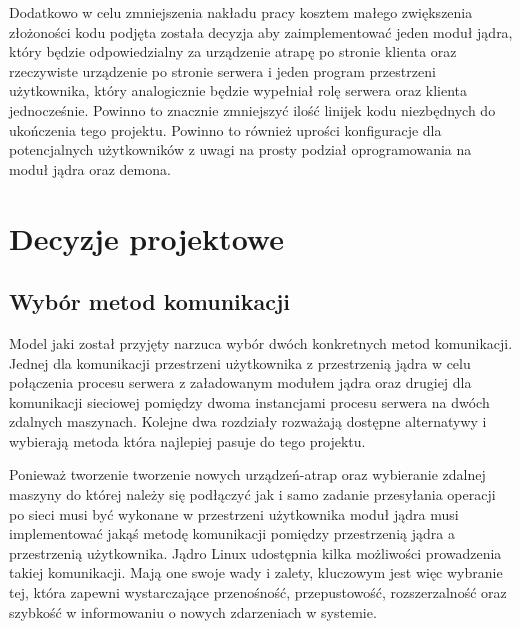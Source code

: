 Dodatkowo w celu zmniejszenia nakładu pracy kosztem małego zwiększenia
złożoności kodu podjęta została decyzja aby zaimplementować jeden moduł
jądra, który będzie odpowiedzialny za urządzenie atrapę po stronie
klienta oraz rzeczywiste urządzenie po stronie serwera i jeden program
przestrzeni użytkownika, który analogicznie będzie wypełniał rolę
serwera oraz klienta jednocześnie. Powinno to znacznie zmniejszyć ilość
linijek kodu niezbędnych do ukończenia tego projektu. Powinno to również
uprości konfiguracje dla potencjalnych użytkowników z uwagi na prosty
podział oprogramowania na moduł jądra oraz demona.

\section{Decyzje projektowe}

\subsection{Wybór metod komunikacji}

Model jaki został przyjęty narzuca wybór dwóch konkretnych metod
komunikacji. Jednej dla komunikacji przestrzeni użytkownika z
przestrzenią jądra w celu połączenia procesu serwera z załadowanym
modułem jądra oraz drugiej dla komunikacji sieciowej pomiędzy dwoma
instancjami procesu serwera na dwóch zdalnych maszynach. Kolejne dwa
rozdziały rozważają dostępne alternatywy i wybierają metoda która
najlepiej pasuje do tego projektu.


Ponieważ tworzenie tworzenie nowych urządzeń-atrap oraz wybieranie
zdalnej maszyny do której należy się podłączyć jak i samo zadanie
przesyłania operacji po sieci musi być wykonane w przestrzeni
użytkownika moduł jądra musi implementować jakąś metodę komunikacji
pomiędzy przestrzenią jądra a przestrzenią użytkownika. Jądro Linux
udostępnia kilka możliwości prowadzenia takiej komunikacji. Mają one
swoje wady i zalety, kluczowym jest więc wybranie tej, która zapewni
wystarczające przenośność, przepustowość, rozszerzalność oraz szybkość w
informowaniu o nowych zdarzeniach w systemie.

